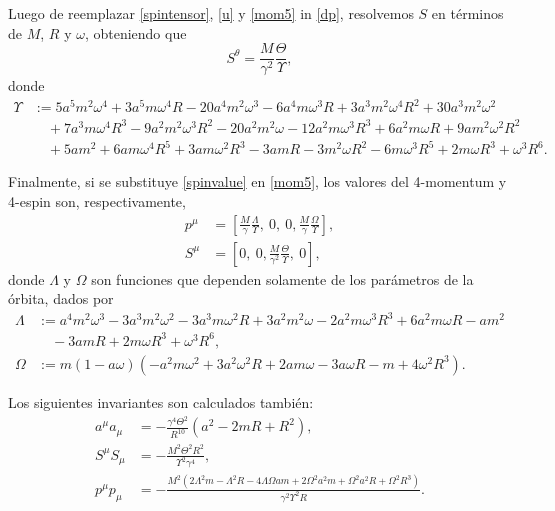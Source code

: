 Luego de reemplazar \eqref{spintensor}, \eqref{u} y \eqref{mom5} in \eqref{dp}, resolvemos $S$ en términos de $M$, $R$ y $\omega$, obteniendo que
\begin{equation}
\label{spinvalue}
S^{\theta} = \frac{M}{\gamma^2}\frac{\Theta}{\Upsilon},
\end{equation}
donde
\begin{align}
\Upsilon &:= 5 a^{5} m^{2} \omega^{4} + 3 a^{5} m \omega^{4} R - 20 a^{4} m^{2} \omega^{3} - 6 a^{4} m \omega^{3} R + 3 a^{3} m^{2} \omega^{4} R^{2} + 30 a^{3} m^{2} \omega^{2} \nonumber \\
& \quad + 7 a^{3} m \omega^{4} R^{3} - 9 a^{2} m^{2} \omega^{3} R^{2} - 20 a^{2} m^{2} \omega - 12 a^{2} m \omega^{3} R^{3} + 6 a^{2} m \omega R + 9 a m^{2} \omega^{2} R^{2} \nonumber \\
& \quad + 5 a m^{2} + 6 a m \omega^{4} R^{5} + 3 a m \omega^{2} R^{3} - 3 a m R - 3 m^{2} \omega R^{2} - 6 m \omega^{3} R^{5} + 2 m \omega R^{3} + \omega^{3} R^{6}.
\end{align}

Finalmente, si se substituye \eqref{spinvalue} en \eqref{mom5}, los valores del 4-momentum y 4-espin son, respectivamente,
\begin{align}
p^{\mu} &= \left[ \frac{M}{\gamma}\frac{\Lambda}{\Upsilon},\ 0,\ 0, \frac{M}{\gamma}\frac{\Omega}{\Upsilon} \right], \label{momentum} \\
S^{\mu} &= \left[ 0, \  0, \frac{M}{\gamma^2}\frac{\Theta}{\Upsilon} , \  0\right], \label{spin}
\end{align}
donde $\Lambda$ y $\Omega$ son funciones que dependen solamente de los parámetros de la órbita, dados por
\begin{align}
\Lambda &:= a^{4} m^{2} \omega^{3} - 3 a^{3} m^{2} \omega^{2} - 3 a^{3} m \omega^{2} R + 3 a^{2} m^{2} \omega - 2 a^{2} m \omega^{3} R^{3} + 6 a^{2} m \omega R - a m^{2} \nonumber \\
& \quad  - 3 a m R  + 2 m \omega R^{3} + \omega^{3} R^{6}
,\\
\Omega &:=  m \left(1-a \omega\right) \left(- a^{2} m \omega^{2} + 3 a^{2} \omega^{2} R + 2 a m \omega - 3 a \omega R - m + 4 \omega^{2} R^{3}\right).
\end{align}

Los siguientes invariantes son calculados también:
\begin{align}
a^{\mu} a_{\mu} &= -\frac{\gamma^4 \Theta^2}{R^{10}}\left( a^{2} - 2 m R + R^{2}\right), \label{aa}\\
S^{\mu} S_{\mu} &= - \frac{M^{2} \Theta^{2} R^{2}}{\Upsilon^{2} \gamma^{4}}, \\
\label{momentumnorm}
p^{\mu} p_{\mu} &= - \frac{M^{2} \left(2 \Lambda^{2} m - \Lambda^{2} R - 4 \Lambda \Omega a m + 2 \Omega^{2} a^{2} m + \Omega^{2} a^{2} R + \Omega^{2} R^{3}\right)}{\gamma^{2} \Upsilon^{2} R}. 
\end{align}

